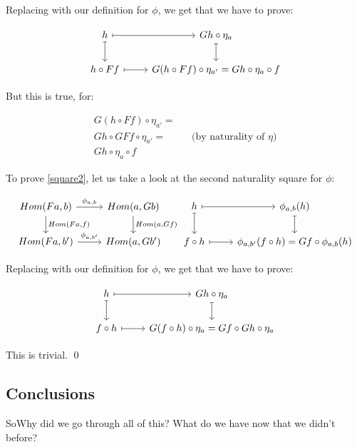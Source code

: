 \documentclass[]{article}
\begin{document}
Replacing with our definition for $\phi$, we get that we have to prove:

\[
\begin{tikzcd}
h \arrow[r, maps to] \arrow[d, maps to] & Gh \circ \eta_a \arrow[d, maps to]
\\ h \circ Ff \arrow[r, maps to] & G(h \circ Ff) \circ \eta_{a'} = Gh \circ \eta_a \circ f
\end{tikzcd}
\]

But this is true, for:

\[
\begin{aligned}
G(h \circ Ff) \circ \eta_{a'} =
\\ Gh \circ GFf \circ \eta_{a'} = && \text{(by naturality of $\eta$)}
\\ Gh \circ \eta_{a} \circ f
\end{aligned}
\]

\blackqed

To prove \cref{square2}, let us take a look at the second naturality square for $\phi$:

\[
\begin{tikzcd}
Hom(Fa, b) \arrow[r, "\phi_{a,b}"] \arrow[d, "{Hom(Fa,f)}"] & Hom(a, Gb) \arrow[d, "{Hom(a, Gf)}"]
\\ Hom(Fa, b') \arrow[r, "\phi_{a,b'}"] & Hom(a, Gb')
\end{tikzcd}
\begin{tikzcd}
h \arrow[r, maps to] \arrow[d, maps to] & \phi_{a,b}(h) \arrow[d, maps to]
\\ f \circ h \arrow[r, maps to] & \phi_{a,b'}(f \circ h) = Gf \circ \phi_{a,b}(h)
\end{tikzcd}
\]

Replacing with our definition for $\phi$, we get that we have to prove:

\[
\begin{tikzcd}
h \arrow[r, maps to] \arrow[d, maps to] & Gh \circ \eta_a \arrow[d, maps to]
\\ f \circ h \arrow[r, maps to] & G(f \circ h) \circ \eta_{a} = Gf \circ Gh \circ \eta_a
\end{tikzcd}
\]

This is trivial. \qed

\subsection{Conclusions}

So\textellipsis Why did we go through all of this? What do we have now that we didn't before?
\end{document}
